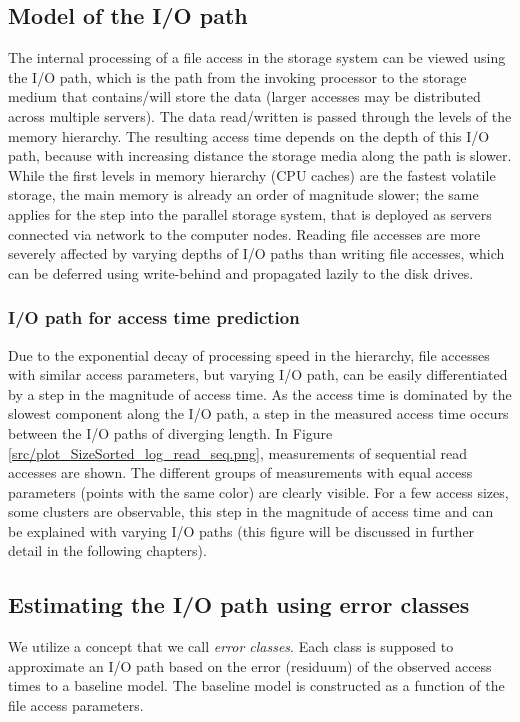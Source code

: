 \documentclass{superfri}
\begin{document}
	\subsection{Model of the I/O path}
	The internal processing of a file access in the storage system can be viewed using the I/O path, which is the path from the invoking processor to the storage medium that contains/will store the data (larger accesses may be distributed across multiple servers). 
	The data read/written is passed through the levels of the memory hierarchy.
	The resulting access time depends on the depth of this I/O path, because with increasing distance the storage media along the path is slower.
	While the first levels in memory hierarchy (CPU caches) are the fastest volatile storage, the main memory is already an order of magnitude slower; the same applies for the step into the parallel storage system, that is deployed as servers connected via network to the computer nodes.
	Reading file accesses are more severely affected by varying depths of I/O paths than writing file accesses, which can be deferred using write-behind and propagated lazily to the disk drives.
	
	\subsubsection{I/O path for access time prediction}
	\label{sec:path_for_pred}
	Due to the exponential decay of processing speed in the hierarchy, file accesses with similar access parameters, but varying I/O path, can be easily differentiated by a step in the magnitude of access time.
	As the access time is dominated by the slowest component along the I/O path, a step in the measured access time occurs between the  I/O paths of diverging length.
	In Figure\,\ref{src/plot_SizeSorted_log_read_seq.png}, measurements of sequential read accesses are shown.
	The different groups of measurements with equal access parameters (points with the same color) are clearly visible.
	For a few access sizes, some clusters are observable, this step in the magnitude of access time and can be explained with varying I/O paths (this figure will be discussed in further detail in the following chapters).
	
	\subsection{Estimating the I/O path using error classes}
	\label{sec:error_classes}
	We utilize a concept that we call \textit{error classes}.
	Each class is supposed to approximate an I/O path based on the error (residuum) of the observed access times to a baseline model.
	The baseline model is constructed as a function of the file access parameters.
	
\end{document}
